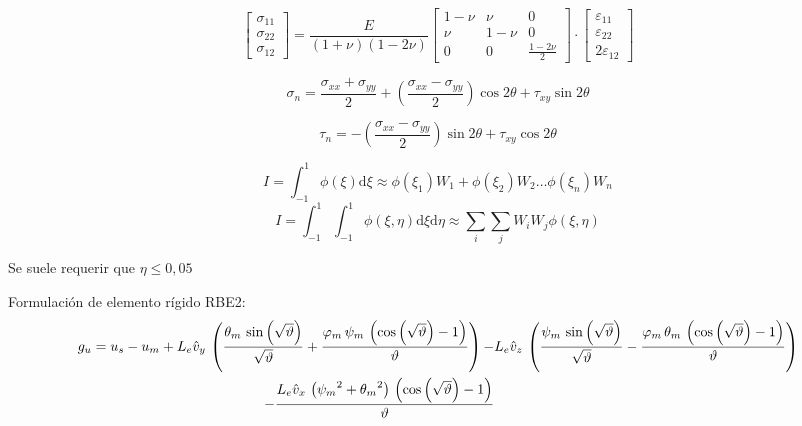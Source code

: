 \documentclass[11pt, a4paper,titlepage]{article}
\newcommand{\di}{\textrm{d}}
\begin{document}
\begin{equation}
\begin{bmatrix}
\sigma_{11} \\
\sigma_{22} \\
\sigma_{12}
\end{bmatrix}
={\frac{E}{(1+\nu)(1-2\nu)}} 
\begin{bmatrix}
1-\nu & \nu &0 \\
\nu &1-\nu& 0 \\
0 & 0 & \frac{1-2\nu}{2}
\end{bmatrix}
\cdot
\begin{bmatrix}
\varepsilon_{11} \\
\varepsilon_{22} \\
2\varepsilon_{12}
\end{bmatrix}
\end{equation}

\begin{equation}
\sigma_{n}=\frac{\sigma_{xx}+\sigma_{yy}}{2}+\left(\frac{\sigma_{xx}-\sigma_{yy}}{2}\right)\cos 2\theta +\tau_{xy}\sin 2\theta 
\end{equation}

\begin{equation}
\tau_{n}=-\left(\frac{\sigma_{xx}-\sigma_{yy}}{2}\right)\sin 2\theta +\tau_{xy}\cos 2\theta 
\end{equation}

\begin{equation}
I=\int^1_{-1} \phi(\xi) \di \xi \approx \phi(\xi_1) W_1+\phi(\xi_2) W_2 \ldots \phi(\xi_n) W_n
\end{equation}
\begin{equation}
I=\int^1_{-1} \int^1_{-1}\phi(\xi,\eta) \di \xi \di \eta\approx \sum_i \sum_j W_i W_j\phi(\xi,\eta) 
\end{equation}

Se suele requerir que $\eta\leq 0,05$


Formulación de elemento rígido RBE2:
\newcommand{\squareangles}{\vartheta}
\begin{align*}
g_u = u_{s}-u_{m}+L_{e}\versor{v}_{y}\,\left(\frac{\theta_{m}\,\sin\left(\sqrt{\squareangles}\right)}{\sqrt{\squareangles}}+\frac{\varphi_{m}\,\psi_{m}\,\left(\cos\left(\sqrt{\squareangles}\right)-1\right)}{\squareangles}\right)-&L_{e}\versor{v}_{z}\,\left(\frac{\psi_{m}\,\sin\left(\sqrt{\squareangles}\right)}{\sqrt{\squareangles}}-\frac{\varphi_{m}\,\theta_{m}\,\left(\cos\left(\sqrt{\squareangles}\right)-1\right)}{\squareangles}\right)\\
 - \frac{L_{e}\versor{v}_{x}\,\left({\psi_{m}}^2+{\theta_{m}}^2\right)\,\left(\cos\left(\sqrt{\squareangles}\right)-1\right)}{\squareangles}
\end{align*}
\end{document}

